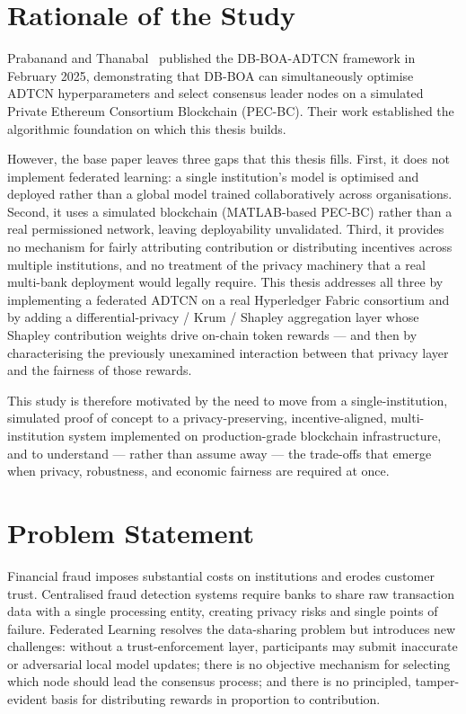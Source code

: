 \section{Rationale of the Study}
Prabanand and Thanabal~\cite{prabanand2025} published the DB-BOA-ADTCN framework in February 2025, demonstrating that DB-BOA can simultaneously optimise ADTCN hyperparameters and select consensus leader nodes on a simulated Private Ethereum Consortium Blockchain (PEC-BC). Their work established the algorithmic foundation on which this thesis builds.

However, the base paper leaves three gaps that this thesis fills. First, it does not implement federated learning: a single institution's model is optimised and deployed rather than a global model trained collaboratively across organisations. Second, it uses a simulated blockchain (MATLAB-based PEC-BC) rather than a real permissioned network, leaving deployability unvalidated. Third, it provides no mechanism for fairly attributing contribution or distributing incentives across multiple institutions, and no treatment of the privacy machinery that a real multi-bank deployment would legally require. This thesis addresses all three by implementing a federated ADTCN on a real Hyperledger Fabric consortium and by adding a differential-privacy / Krum / Shapley aggregation layer whose Shapley contribution weights drive on-chain token rewards — and then by characterising the previously unexamined interaction between that privacy layer and the fairness of those rewards.

This study is therefore motivated by the need to move from a single-institution, simulated proof of concept to a privacy-preserving, incentive-aligned, multi-institution system implemented on production-grade blockchain infrastructure, and to understand — rather than assume away — the trade-offs that emerge when privacy, robustness, and economic fairness are required at once.

\section{Problem Statement}
Financial fraud imposes substantial costs on institutions and erodes customer trust. Centralised fraud detection systems require banks to share raw transaction data with a single processing entity, creating privacy risks and single points of failure. Federated Learning resolves the data-sharing problem but introduces new challenges: without a trust-enforcement layer, participants may submit inaccurate or adversarial local model updates; there is no objective mechanism for selecting which node should lead the consensus process; and there is no principled, tamper-evident basis for distributing rewards in proportion to contribution.


